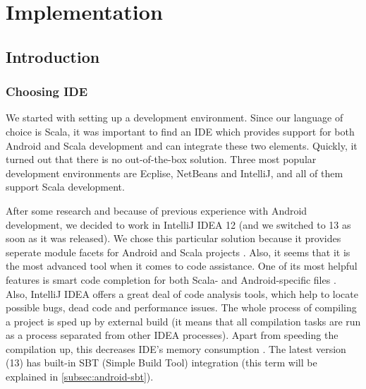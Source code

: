 %
%
%
%
%

\chapter{Implementation}
\label{chap:implementation}

\section{Introduction}
\label{sec:impl-intro}

\subsection{Choosing IDE}
\label{subsec:choosing-ide}
We started with setting up a development environment. Since our language of choice is Scala, it was important to find an IDE which provides support for both Android and Scala development and can integrate these two elements. Quickly, it turned out that there is no out-of-the-box solution. Three most popular development environments are Ecplise, NetBeans and IntelliJ, and all of them support Scala development. 

After some research and because of previous experience with Android development, we decided to work in IntelliJ IDEA 12 (and we switched to 13 as soon as it was released). We chose this particular solution because it provides seperate module facets for Android and Scala projects \cite{Steingress:2011:AndroidScala}. Also, it seems that it is the most advanced tool when it comes to code assistance. One of its most helpful features is smart code completion for both Scala- and Android-specific files \cite{Steingress:2011:AndroidScala}. Also, IntelliJ IDEA offers a great deal of code analysis tools, which help to locate possible bugs, dead code and performance issues. The whole process of compiling a project is sped up by external build (it means that all compilation tasks are run as a process separated from other IDEA processes). Apart from speeding the compilation up, this decreases IDE's memory consumption \cite{Fatin:2012:NewWay}. The latest version (13) has built-in SBT (Simple Build Tool) integration (this term will be explained in \cref{subsec:android-sbt}).

